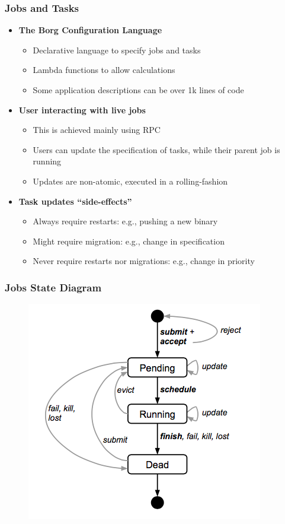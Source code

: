 \begin{frame}
\frametitle{Jobs and Tasks}

\begin{itemize}
	\item {\bf The Borg Configuration Language}
	\begin{itemize}
		\item Declarative language to specify jobs and tasks
		\item Lambda functions to allow calculations
		\item Some application descriptions can be over 1k lines of code
	\end{itemize}

\vspace{20pt}

	\item {\bf User interacting with live jobs}
	\begin{itemize}
		\item This is achieved mainly using RPC
		\item Users can update the specification of tasks, while their parent job is running
		\item Updates are non-atomic, executed in a rolling-fashion
	\end{itemize}

\vspace{20pt}

	\item {\bf Task updates ``side-effects''}
	\begin{itemize}
		\item Always require restarts: e.g., pushing a new binary
		\item Might require migration: e.g., change in specification
		\item Never require restarts nor migrations: e.g., change in priority
	\end{itemize}
\end{itemize}
\end{frame}

\begin{frame}
\frametitle{Jobs State Diagram}
\begin{figure}[h]
  \centering
  \includegraphics[scale=0.5]{./figures/borg_state_diagram}
  \label{fig:borg_state_diagram}
\end{figure}
\end{frame}

